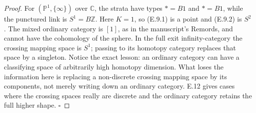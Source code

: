 \begin{proof}
For $(\mathbb P^1,\{\infty\})$ over $\mathbb C$, the strata have types $*=B1$ and $*=B1$, while the punctured link is $S^1=B\mathbb Z$. Here $K=1$, so (E.9.1) is a point and (E.9.2) is $S^2$. The mixed ordinary category is $[1]$, as in the manuscript's Remords, and cannot have the cohomology of the sphere. In the full exit infinity-category the crossing mapping space is $S^1$; passing to its homotopy category replaces that space by a singleton. Notice the exact lesson: an ordinary category can have a classifying space of arbitrarily high homotopy dimension. What loses the information here is replacing a non-discrete crossing mapping space by its components, not merely writing down an ordinary category. E.12 gives cases where the crossing spaces really are discrete and the ordinary category retains the full higher shape. \hfill$\square$
\end{proof}


